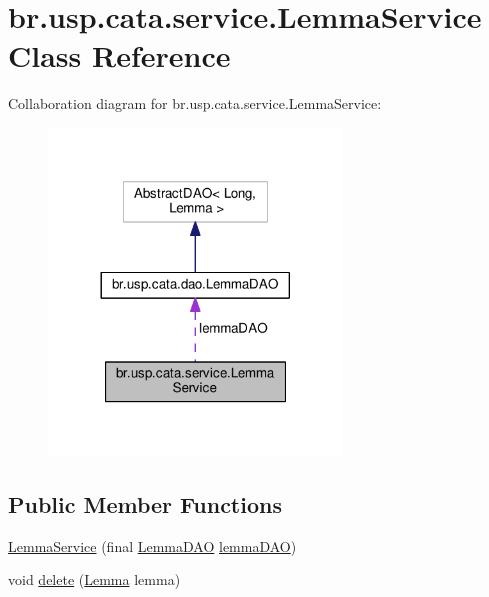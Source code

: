 \hypertarget{classbr_1_1usp_1_1cata_1_1service_1_1_lemma_service}{\section{br.\+usp.\+cata.\+service.\+Lemma\+Service Class Reference}
\label{classbr_1_1usp_1_1cata_1_1service_1_1_lemma_service}
}


Collaboration diagram for br.\+usp.\+cata.\+service.\+Lemma\+Service\+:\nopagebreak
\begin{figure}[H]
\begin{center}
\leavevmode
\includegraphics[width=221pt]{classbr_1_1usp_1_1cata_1_1service_1_1_lemma_service__coll__graph}
\end{center}
\end{figure}
\subsection*{Public Member Functions}
\begin{DoxyCompactItemize}
\item 
\hyperlink{classbr_1_1usp_1_1cata_1_1service_1_1_lemma_service_a5dbdfd9531792e1c9da3357fa9eb3479}{Lemma\+Service} (final \hyperlink{classbr_1_1usp_1_1cata_1_1dao_1_1_lemma_d_a_o}{Lemma\+D\+A\+O} \hyperlink{classbr_1_1usp_1_1cata_1_1service_1_1_lemma_service_a2f87c52f925c81614ce5271a5ed53c24}{lemma\+D\+A\+O})
\item 
void \hyperlink{classbr_1_1usp_1_1cata_1_1service_1_1_lemma_service_aa740456b68df67e67f384e04e5cf8b6e}{delete} (\hyperlink{classbr_1_1usp_1_1cata_1_1model_1_1_lemma}{Lemma} lemma)
\end{DoxyCompactItemize}
